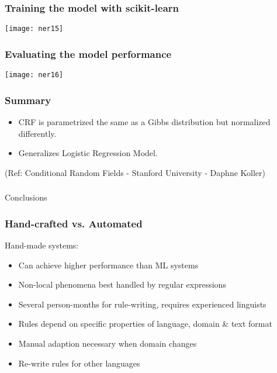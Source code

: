 \begin{frame}[fragile]\frametitle{Training the model with scikit-learn}

\begin{center}
\texttt{[image: ner15]}
\end{center}

\end{frame}

\begin{frame}[fragile]\frametitle{Evaluating the model  performance}

\begin{center}
\texttt{[image: ner16]}
\end{center}

\end{frame}

\begin{frame}[fragile]\frametitle{Summary}
  \begin{itemize}
  \item CRF is parametrized the same as a Gibbs distribution but normalized differently.
	\item Generalizes Logistic Regression Model.
  \end{itemize}
	

	{\tiny (Ref: Conditional Random Fields - Stanford University - Daphne Koller)}
	
	
\end{frame}



\begin{frame}[fragile]\frametitle{}

\begin{center}
{\Large Conclusions}
\end{center}
\end{frame}


\begin{frame}[fragile]\frametitle{Hand-crafted vs. Automated }
Hand-made systems:
  \begin{itemize}
  \item Can achieve higher performance than ML systems
  \item Non-local phenomena best handled by regular expressions
  \item Several person-months for rule-writing, requires experienced linguists
  \item Rules depend on specific properties of language, domain \& text format  
  \item Manual adaption necessary when domain changes
  \item Re-write rules for other languages
  \end{itemize}
\end{frame}

